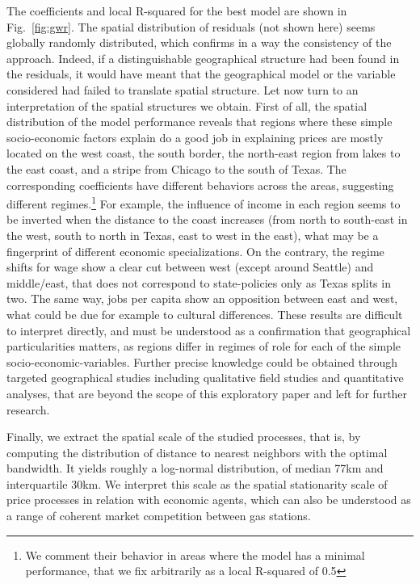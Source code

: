 \documentclass[3p,times,procedia]{elsarticle}
\begin{document}
The coefficients and local R-squared for the best model are shown in Fig.~\ref{fig:gwr}. The spatial distribution of residuals (not shown here) seems globally randomly distributed, which confirms in a way the consistency of the approach. Indeed, if a distinguishable geographical structure had been found in the residuals, it would have meant that the geographical model or the variable considered had failed to translate spatial structure. Let now turn to an interpretation of the spatial structures we obtain. First of all, the spatial distribution of the model performance reveals that regions where these simple socio-economic factors explain do a good job in explaining prices are mostly located on the west coast, the south border, the north-east region from lakes to the east coast, and a stripe from Chicago to the south of Texas. The corresponding coefficients have different behaviors across the areas, suggesting different regimes.\footnote{We comment their behavior in areas where the model has a minimal performance, that we fix arbitrarily as a local R-squared of 0.5} For example, the influence of income in each region seems to be inverted when the distance to the coast increases (from north to south-east in the west, south to north in Texas, east to west in the east), what may be a fingerprint of different economic specializations. On the contrary, the regime shifts for wage show a clear cut between west (except around Seattle) and middle/east, that does not correspond to state-policies only as Texas splits in two. The same way, jobs per capita show an opposition between east and west, what could be due for example to cultural differences. These results are difficult to interpret directly, and must be understood as a confirmation that geographical particularities matters, as regions differ in regimes of role for each of the simple socio-economic-variables. Further precise knowledge could be obtained through targeted geographical studies including qualitative field studies and quantitative analyses, that are beyond the scope of this exploratory paper and left for further research.

Finally, we extract the spatial scale of the studied processes, that is, by computing the distribution of distance to nearest neighbors with the optimal bandwidth. It yields roughly a log-normal distribution, of median 77km and interquartile 30km. We interpret this scale as the spatial stationarity scale of price processes in relation with economic agents, which can also be understood as a range of coherent market competition between gas stations.
\end{document}
